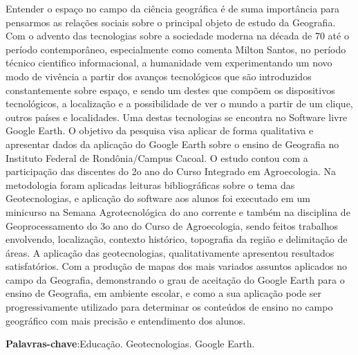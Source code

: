\documentclass[article,12pt,onesidea,4paper,english,brazil]{abntex2}
\begin{document}
	\noindent Entender o espaço no campo da ciência geográfica é de suma importância para
	pensarmos as relações sociais sobre o principal objeto de estudo da Geografia. Com
	o advento das tecnologias sobre a sociedade moderna na década de 70 até o
	período contemporâneo, especialmente como comenta Milton Santos, no período
	técnico cientifico informacional, a humanidade vem experimentando um novo modo
	de vivência a partir dos avanços tecnológicos que são introduzidos constantemente
	sobre espaço, e sendo um destes que compõem os dispositivos tecnológicos, a
	localização e a possibilidade de ver o mundo a partir de um clique, outros países e
	localidades. Uma destas tecnologias se encontra no Software livre Google Earth. O
	objetivo da pesquisa visa aplicar de forma qualitativa e apresentar dados da
	aplicação do Google Earth sobre o ensino de Geografia no Instituto Federal de
	Rondônia/Campus Cacoal. O estudo contou com a participação das discentes do 2o
	ano do Curso Integrado em Agroecologia. Na metodologia foram aplicadas leituras
	bibliográficas sobre o tema das Geotecnologias, e aplicação do software aos alunos
	foi executado em um minicurso na Semana Agrotecnológica do ano corrente e
	também na disciplina de Geoprocessamento do 3o ano do Curso de Agroecologia,
	sendo feitos trabalhos envolvendo, localização, contexto histórico, topografia da
	região e delimitação de áreas. A aplicação das geotecnologias, qualitativamente
	apresentou resultados satisfatórios. Com a produção de mapas dos mais variados
	assuntos aplicados no campo da Geografia, demonstrando o grau de aceitação do
	Google Earth para o ensino de Geografia, em ambiente escolar, e como a sua
	aplicação pode ser progressivamente utilizado para determinar os conteúdos de
	ensino no campo geográfico com mais precisão e entendimento dos alunos.
	
	\vspace{\onelineskip}
	
	\noindent
	\textbf{Palavras-chave}:Educação. Geotecnologias. Google Earth.
	
\end{document}
